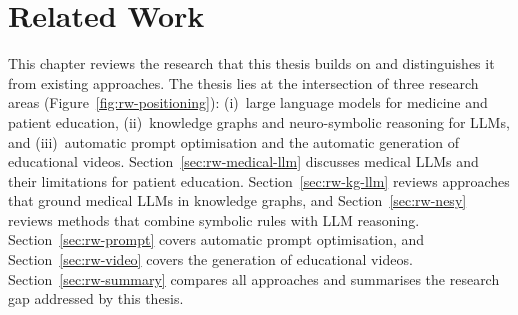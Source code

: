 
\chapter{Related Work}
\label{chap:related-work}

This chapter reviews the research that this thesis builds on and
distinguishes it from existing approaches. The thesis lies at the
intersection of three research areas (Figure~\ref{fig:rw-positioning}):
(i)~large language models for medicine and patient education,
(ii)~knowledge graphs and neuro-symbolic reasoning for LLMs, and
(iii)~automatic prompt optimisation and the automatic generation of
educational videos. Section~\ref{sec:rw-medical-llm} discusses medical LLMs
and their limitations for patient education.
Section~\ref{sec:rw-kg-llm} reviews approaches that ground medical LLMs in
knowledge graphs, and Section~\ref{sec:rw-nesy} reviews methods that combine
symbolic rules with LLM reasoning. Section~\ref{sec:rw-prompt} covers
automatic prompt optimisation, and Section~\ref{sec:rw-video} covers the
generation of educational videos. Section~\ref{sec:rw-summary} compares all
approaches and summarises the research gap addressed by this thesis.

